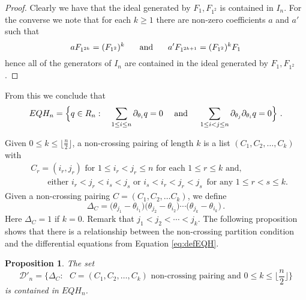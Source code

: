 \documentclass[submission]{FPSAC2023}
\newtheorem{prop}[theorem]{Proposition}
\theoremstyle{definition}
\numberwithin{equation}{section}
\begin{document}
\begin{proof} Clearly we have that the ideal generated by $F_1, F_{1^2}$ is contained in $I_n$.
For the converse we note that for each $k\geq 1$
there are non-zero coefficients $a$ and $a'$ such that
\[
a F_{1^{2k}} = (F_{1^2})^k \hskip .2in\hbox{   and   }\hskip .2in a' F_{1^{2k+1}} = (F_{1^2})^k F_1
\]
hence all of the generators of $I_n$ are contained in the ideal generated by $F_1, F_{1^2}$.
\end{proof}
From this we conclude that
\begin{equation}\label{eq:defEQH}
EQH_n =  \Big\{ q \in R_n :  \quad\sum_{1\le i\le n} \partial_{\theta_i}q= 0 \quad\hbox{ and  }\quad \sum_{1\le i<j\le n} \partial_{\theta_j}\partial_{\theta_i}q= 0 \Big\}~.
\end{equation}

Given $0\le k\le \lfloor \frac{n}{2}\rfloor$, a non-crossing pairing of length $k$ is a
list $(C_1, C_2, \ldots, C_k)$ with
\begin{align*}
 &C_r=(i_r,j_r) \text{ for $1\le i_r<j_r\le n$ for each $1 \leq r \leq k$ and,}\\
 &\qquad \text{either } i_r<j_r<i_s<j_s  \text{ or }  i_s<i_r<j_r<j_s\,\text{ for any $1\le r<s\le k$}.
\end{align*}
Given a non-crossing pairing $C=(C_1,C_2,\ldots C_k)$, we define
\begin{equation}\label{eq:Deltadef}
\Delta_C = \big(\theta_{j_1}-\theta_{i_1}\big)\big(\theta_{j_2}-\theta_{i_2}\big)\cdots \big(\theta_{j_k}-\theta_{i_k}\big)\,.
\end{equation}
Here $\Delta_C=1$ if $k=0$. Remark that $j_1<j_2<\cdots< j_k$.
The following proposition shows that there is a relationship between the non-crossing
partition condition and the differential equations from Equation \eqref{eq:defEQH}.

\begin{prop}\label{prop:harmelem}
The set
$${\mathcal D}'_n =\big\{ \Delta_C: \text{ $C=(C_1,C_2,\ldots, C_k)$  non-crossing pairing and $0\le k\le \lfloor \frac{n}{2}\rfloor$}\big\}
$$
is contained in $EQH_n $.
\end{prop}
\end{document}
